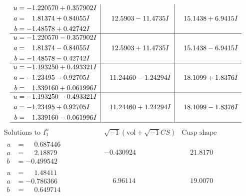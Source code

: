 \documentclass[1p]{elsarticle_modified}
\theoremstyle{definition}
\newcommand{\I}{\sqrt{-1}}
\begin{document}
$$\begin{array}{c|c|c}
\begin{aligned}
u &= -1.220570 + 0.357902 I \\
a &= \phantom{-}1.81374 + 0.84055 I \\
b &= -1.48578 + 0.42742 I\end{aligned}
 & \phantom{-}12.5903 - 11.4735 I & \phantom{-}15.1438 + 6.9415 I \\ \hline\begin{aligned}
u &= -1.220570 - 0.357902 I \\
a &= \phantom{-}1.81374 - 0.84055 I \\
b &= -1.48578 - 0.42742 I\end{aligned}
 & \phantom{-}12.5903 + 11.4735 I & \phantom{-}15.1438 - 6.9415 I \\ \hline\begin{aligned}
u &= -1.193250 + 0.493321 I \\
a &= -1.23495 - 0.92705 I \\
b &= \phantom{-}1.339160 + 0.061996 I\end{aligned}
 & \phantom{-}11.24460 - 1.24294 I & \phantom{-}18.1099 + 1.8376 I \\ \hline\begin{aligned}
u &= -1.193250 - 0.493321 I \\
a &= -1.23495 + 0.92705 I \\
b &= \phantom{-}1.339160 - 0.061996 I\end{aligned}
 & \phantom{-}11.24460 + 1.24294 I & \phantom{-}18.1099 - 1.8376 I\\
 \hline 
 \end{array}$$\newpage$$\begin{array}{c|c|c}  
\text{Solutions to }I^u_{1}& \I (\text{vol} + \sqrt{-1}CS) & \text{Cusp shape}\\
 \hline 
\begin{aligned}
u &= \phantom{-}0.687446\phantom{ +0.000000I} \\
a &= \phantom{-}2.18879\phantom{ +0.000000I} \\
b &= -0.499542\phantom{ +0.000000I}\end{aligned}
 & -0.430924\phantom{ +0.000000I} & \phantom{-}21.8170\phantom{ +0.000000I} \\ \hline\begin{aligned}
u &= \phantom{-}1.48411\phantom{ +0.000000I} \\
a &= -0.786366\phantom{ +0.000000I} \\
b &= \phantom{-}0.649714\phantom{ +0.000000I}\end{aligned}
 & \phantom{-}6.96114\phantom{ +0.000000I} & \phantom{-}19.0070\phantom{ +0.000000I} \\ \hline\begin{aligned}

\end{aligned}
\end{array}$$
\end{document}
